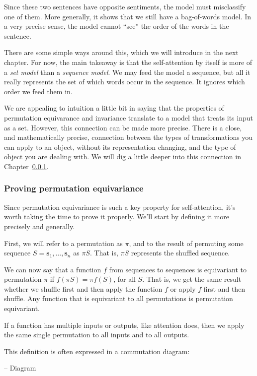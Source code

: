 \documentclass{pca}
\newcommand{\mbs}{\mathbold s}
\theoremstyle{theorem}
\theoremstyle{definition}
\theoremstyle{proof}
\begin{document}
Since these two sentences have opposite sentiments, the model must misclassify one of them. More generally, it shows that we still have a bag-of-words model. In a very precise sense, the model cannot ``see'' the order of the words in the sentence. 

There are some simple ways around this, which we will introduce in the next chapter. For now, the main takeaway is that the self-attention by itself is more of a \emph{set model} than a \emph{sequence model}. We may feed the model a sequence, but all it really represents the set of which words occur in the sequence. It ignores which order we feed them in.

We are appealing to intuition a little bit in saying that the properties of permutation equivarance and invariance translate to a model that treats its input as a set. However, this connection can be made more precise. There is a close, and mathematically precise, connection between the types of transformations you can apply to an object, without its representation changing, and the type of object you are dealing with. We will dig a little deeper into this connection in Chapter~\ref{}.

\subsubsection{Proving permutation equivariance}

Since permutation equivariance is such a key property for self-attention, it's worth taking the time to prove it properly. We'll start by defining it more precisely and generally.

First, we will refer to a permutation as $\pi$, and to the result of permuting some sequence $S = \mbs_1, \ldots, \mbs_n$ as $\pi S$. That is,  $\pi S$ represents the shuffled sequence.

We can now say that a function $f$ from sequences to sequences is equivariant to permutation $\pi$ if $f (\pi S) = \pi f(S)$, for all $S$. That is, we get the same result whether we shuffle first and then apply the function $f$ or apply $f$ first and then shuffle. Any function that is equivariant to all permutations is permutation equivariant.

If a function has multiple inputs or outputs, like attention does, then we apply the same single permutation to all inputs and to all outputs.

This definition is often expressed in a commutation diagram:

-- Diagram
\end{document}
